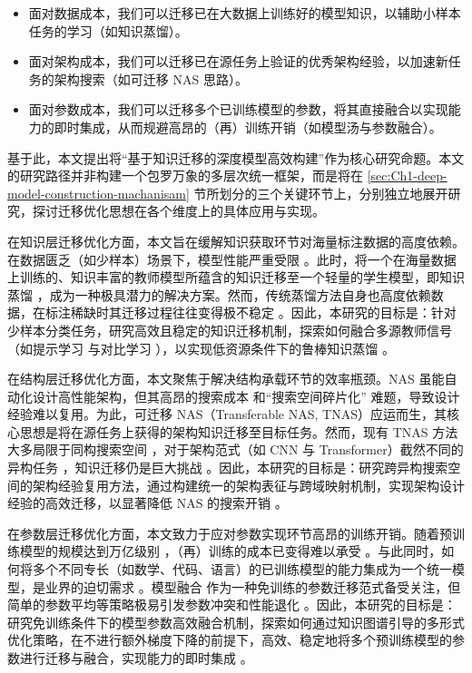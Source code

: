 \documentclass[../main.tex]{subfiles}
\begin{document}
\begin{itemize}[leftmargin=3em]
	\item 面对数据成本，我们可以迁移已在大数据上训练好的模型知识，以辅助小样本任务的学习（如知识蒸馏）\cite{distillingknowledgeneural_hinton_2015}。
	\item 面对架构成本，我们可以迁移已在源任务上验证的优秀架构经验，以加速新任务的架构搜索（如可迁移 NAS 思路）\cite{learningtransferablearchitectures_zoph_2018,neuralarchitecturesearch_elsken_2019}。
	\item 面对参数成本，我们可以迁移多个已训练模型的参数，将其直接融合以实现能力的即时集成，从而规避高昂的（再）训练开销（如模型汤与参数融合）\cite{modelsoupsaveraging_wortsman_2022,mergingmodelsfisher_matena_2022}。
\end{itemize}

基于此，本文提出将“基于知识迁移的深度模型高效构建”作为核心研究命题。本文的研究路径并非构建一个包罗万象的多层次统一框架，而是将在 \ref{sec:Ch1-deep-model-construction-machanisam} 节所划分的三个关键环节上，分别独立地展开研究，探讨迁移优化思想在各个维度上的具体应用与实现。

在知识层迁移优化方面，本文旨在缓解知识获取环节对海量标注数据的高度依赖。在数据匮乏（如少样本）场景下，模型性能严重受限 。此时，将一个在海量数据上训练的、知识丰富的教师模型所蕴含的知识迁移至一个轻量的学生模型，即知识蒸馏 ，成为一种极具潜力的解决方案。然而，传统蒸馏方法自身也高度依赖数据，在标注稀缺时其迁移过程往往变得极不稳定 。因此，本研究的目标是：针对少样本分类任务，研究高效且稳定的知识迁移机制，探索如何融合多源教师信号（如提示学习 与对比学习 ），以实现低资源条件下的鲁棒知识蒸馏 。

在结构层迁移优化方面，本文聚焦于解决结构承载环节的效率瓶颈。NAS 虽能自动化设计高性能架构，但其高昂的搜索成本 和“搜索空间碎片化” 难题，导致设计经验难以复用。为此，可迁移 NAS（Transferable NAS, TNAS）应运而生，其核心思想是将在源任务上获得的架构知识迁移至目标任务。然而，现有 TNAS 方法大多局限于同构搜索空间 ，对于架构范式（如 CNN 与 Transformer）截然不同的异构任务 ，知识迁移仍是巨大挑战 。因此，本研究的目标是：研究跨异构搜索空间的架构经验复用方法，通过构建统一的架构表征与跨域映射机制，实现架构设计经验的高效迁移，以显著降低 NAS 的搜索开销 。

在参数层迁移优化方面，本文致力于应对参数实现环节高昂的训练开销。随着预训练模型的规模达到万亿级别 ，（再）训练的成本已变得难以承受 。与此同时，如何将多个不同专长（如数学、代码、语言）的已训练模型的能力集成为一个统一模型，是业界的迫切需求 。模型融合 作为一种免训练的参数迁移范式备受关注，但简单的参数平均等策略极易引发参数冲突和性能退化 。因此，本研究的目标是：研究免训练条件下的模型参数高效融合机制，探索如何通过知识图谱引导的多形式优化策略，在不进行额外梯度下降的前提下，高效、稳定地将多个预训练模型的参数进行迁移与融合，实现能力的即时集成 。
\end{document}
